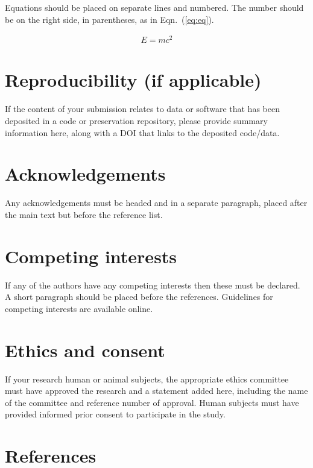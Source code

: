 \documentclass{article}
\begin{document}
Equations should be placed on separate lines and numbered.
The number should be on the right side, in parentheses,
as in Eqn.~(\ref{eq:eq}).

\begin{align}\label{eq:eq}
E = mc^2
\end{align}

\section{Reproducibility (if applicable)}

If the content of your submission relates to data or software
that has been deposited in a code or preservation repository,
please provide summary information here, along with a DOI that
links to the deposited code/data.

\section{Acknowledgements}

Any acknowledgements must be headed and in a separate paragraph,
placed after the main text but before the reference list.

\section{Competing interests}

If any of the authors have any competing interests then these
must be declared. A short paragraph should be placed before
the references.
Guidelines for competing interests are available online.%

\section{Ethics and consent}

If your research human or animal subjects, the appropriate ethics
committee must have approved the research and a statement added here,
including the name of the committee and reference number of approval.
Human subjects must have provided informed prior consent
to participate in the study.

\section{References}
\end{document}
